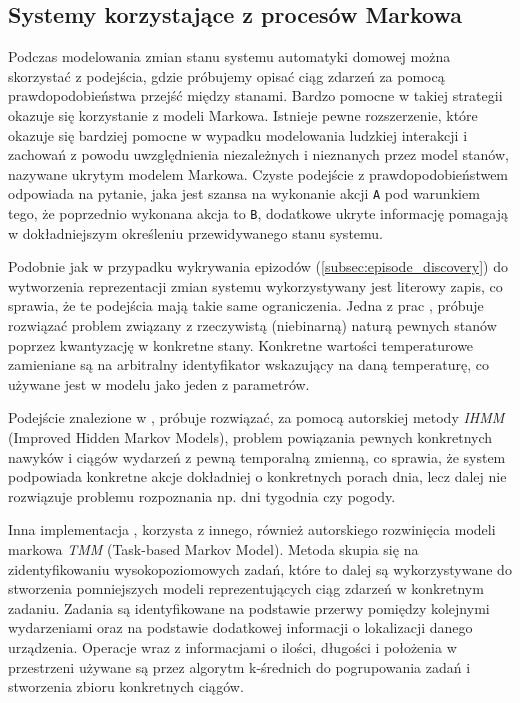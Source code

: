 \subsection{Systemy korzystające z procesów Markowa}
Podczas modelowania zmian stanu systemu automatyki domowej można skorzystać z podejścia, gdzie próbujemy opisać ciąg zdarzeń za pomocą prawdopodobieństwa przejść między stanami. Bardzo pomocne w takiej strategii okazuje się korzystanie z modeli Markowa. Istnieje pewne rozszerzenie, które okazuje się bardziej pomocne w wypadku modelowania ludzkiej interakcji i zachowań z powodu uwzględnienia niezależnych i nieznanych przez model stanów, nazywane ukrytym modelem Markowa. Czyste podejście z prawdopodobieństwem odpowiada na pytanie, jaka jest szansa na wykonanie akcji \verb+A+ pod warunkiem tego, że poprzednio wykonana akcja to \verb+B+, dodatkowe ukryte informację pomagają w dokładniejszym określeniu przewidywanego stanu systemu.

Podobnie jak w przypadku wykrywania epizodów (\ref{subsec:episode_discovery}) do wytworzenia reprezentacji zmian systemu wykorzystywany jest literowy zapis, co sprawia, że te podejścia mają takie same ograniczenia. Jedna z prac \cite{markov_1}, próbuje rozwiązać problem związany z rzeczywistą (niebinarną) naturą pewnych stanów poprzez kwantyzację w konkretne stany. Konkretne wartości temperaturowe zamieniane są na arbitralny identyfikator wskazujący na daną temperaturę, co używane jest w modelu jako jeden z parametrów.

Podejście znalezione w \cite{markov_1}, próbuje rozwiązać, za pomocą autorskiej metody \textit{IHMM} (Improved Hidden Markov Models), problem powiązania pewnych konkretnych nawyków i ciągów wydarzeń z pewną temporalną zmienną, co sprawia, że system podpowiada konkretne akcje dokładniej o konkretnych porach dnia, lecz dalej nie rozwiązuje problemu rozpoznania np. dni tygodnia czy pogody.

Inna implementacja \cite{markov_2}, korzysta z innego, również autorskiego rozwinięcia modeli markowa \textit{TMM} (Task-based Markov Model). Metoda skupia się na zidentyfikowaniu wysokopoziomowych zadań, które to dalej są wykorzystywane do stworzenia pomniejszych modeli reprezentujących ciąg zdarzeń w konkretnym zadaniu. Zadania są identyfikowane na podstawie przerwy pomiędzy kolejnymi wydarzeniami oraz na podstawie dodatkowej informacji o lokalizacji danego urządzenia. Operacje wraz z informacjami o ilości, długości i położenia w przestrzeni używane są przez algorytm k-średnich do pogrupowania zadań i stworzenia zbioru konkretnych ciągów.

